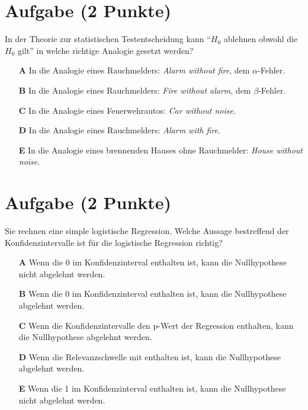 \documentclass[a4paper, 10pt]{scrartcl}\usepackage[]{graphicx}\usepackage[]{xcolor}
\begin{document}
\section{Aufgabe \hfill (2 Punkte)}



In der Theorie zur statistischen Testentscheidung kann "`$H_0$ ablehnen obwohl die $H_0$ gilt"'
in welche richtige Analogie gesetzt werden?



\begin{enumerate}
\item [\textbf{A} \msquare] In die Analogie eines Rauchmelders: \textit{Alarm without fire}, dem $\alpha$-Fehler.
\item [\textbf{B} \msquare] In die Analogie eines Rauchmelders: \textit{Fire without alarm}, dem $\beta$-Fehler.
\item [\textbf{C} \msquare] In die Analogie eines Feuerwehrautos: \textit{Car without noise}.
\item [\textbf{D} \msquare] In die Analogie eines Rauchmelders: \textit{Alarm with fire}.
\item [\textbf{E} \msquare] In die Analogie eines brennenden Hauses ohne Rauchmelder: \textit{House without noise}.
\end{enumerate}

\section{Aufgabe \hfill (2 Punkte)}



Sie rechnen eine simple logistische Regression. Welche Aussage bestreffend der
Konfidenzintervalle ist f{\"u}r die logistische Regression richtig?



\begin{enumerate}
\item [\textbf{A} \msquare] Wenn die 0 im Konfidenzinterval enthalten ist, kann die Nullhypothese nicht abgelehnt werden.
\item [\textbf{B} \msquare] Wenn die 0 im Konfidenzinterval enthalten ist, kann die Nullhypothese abgelehnt werden.
\item [\textbf{C} \msquare] Wenn die Konfidenzintervalle den p-Wert der Regression enthalten, kann die Nullhypothese abgelehnt werden.
\item [\textbf{D} \msquare] Wenn die Relevanzschwelle mit enthalten ist, kann die Nullhypothese abgelehnt werden.
\item [\textbf{E} \msquare] Wenn die 1 im Konfidenzinterval enthalten ist, kann die Nullhypothese nicht abgelehnt werden.
\end{enumerate}
\end{document}
